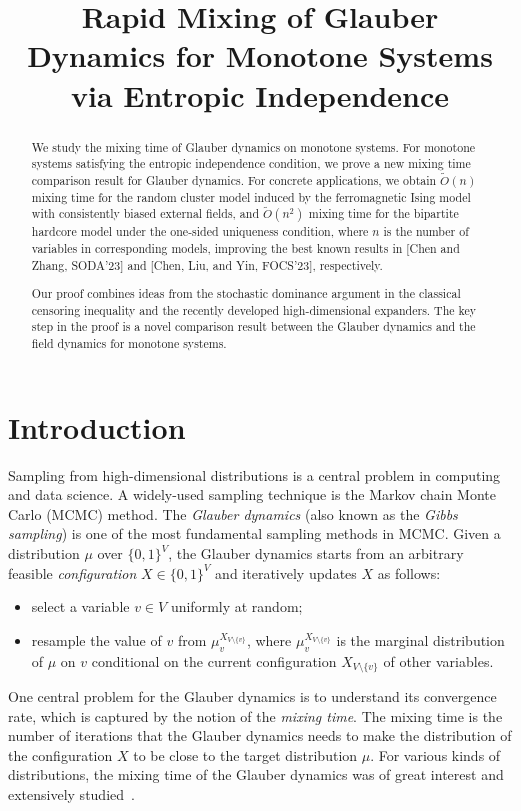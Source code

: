 \documentclass[11pt,a4paper]{article}
\title{Rapid Mixing of Glauber Dynamics for Monotone Systems\\ via Entropic Independence}
\date{}
\theoremstyle{definition}
\begin{document}
\maketitle

\begin{abstract}
We study the mixing time of Glauber dynamics on monotone systems.
For monotone systems satisfying the entropic independence condition, we prove a new mixing time comparison result for Glauber dynamics.
For concrete applications, we obtain $\tilde{O}(n)$ mixing time for the random cluster model induced by the ferromagnetic Ising model with consistently biased external fields, and $\tilde{O}(n^2)$ mixing time for the bipartite hardcore model under the one-sided uniqueness condition, where $n$ is the number of variables in corresponding models, improving the best known results in [Chen and Zhang, SODA'23] and [Chen, Liu, and Yin, FOCS'23], respectively.

Our proof combines ideas from the stochastic dominance argument in the classical censoring inequality and the recently developed high-dimensional expanders. The key step in the proof is a novel comparison result between the Glauber dynamics and the field dynamics for monotone systems.
\end{abstract}
\section{Introduction}


Sampling from high-dimensional distributions is a central problem in computing and data science. 
A widely-used sampling technique is the Markov chain Monte Carlo (MCMC) method. 
The \emph{Glauber dynamics} (also known as the \emph{Gibbs sampling}) is one of the most fundamental sampling methods in MCMC. Given a distribution $\mu$ over $\{0,1\}^V$, the Glauber dynamics starts from an arbitrary feasible \emph{configuration} $X \in \{0,1\}^V$ and iteratively updates $X$ as follows:
\begin{itemize}
    \item select a variable $v \in V$ uniformly at random;
    \item resample the value of $v$ from $\mu_v^{X_{V \setminus \{v\}}}$, where $\mu_v^{X_{V \setminus \{v\}}}$ is the marginal distribution of $\mu$ on $v$ conditional on the current configuration $X_{V \setminus \{v\}}$ of other variables.
\end{itemize}
One central problem for the Glauber dynamics is to understand its convergence rate, which is captured by the notion of the \emph{mixing time}. The mixing time is the number of iterations that the Glauber dynamics needs to make the distribution of the configuration $X$ to be close to the target distribution $\mu$. 
For various kinds of distributions, the mixing time of the Glauber dynamics was of great interest and extensively studied~\cite{levin2017markov}. 
\end{document}
